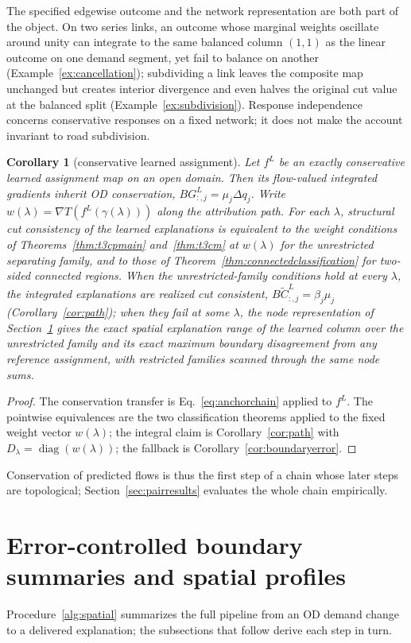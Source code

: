 \documentclass[a4paper,fleqn]{cas-sc}
\newtheorem{corollary}[theorem]{Corollary}
\begin{document}
The specified edgewise outcome and the network representation are both
part of the object. On two series links, an outcome whose marginal
weights oscillate around unity can integrate to the same balanced column
$(1,1)$ as the linear outcome on one demand segment, yet fail to balance
on another (Example~\ref{ex:cancellation}); subdividing a link leaves
the composite map unchanged but creates interior divergence and even
halves the original cut value at the balanced split
(Example~\ref{ex:subdivision}). Response independence concerns
conservative responses on a fixed network; it does not make the account
invariant to road subdivision.

\begin{corollary}[conservative learned assignment]\label{cor:learned}
Let $f^L$ be an exactly conservative learned assignment map on an open
domain. Then its flow-valued integrated gradients inherit OD
conservation, $BG^L_{:,j}=\mu_j\Delta q_j$. Write
$w(\lambda)=\nabla T(f^L(\gamma(\lambda)))$ along the attribution path.
For each $\lambda$, structural cut consistency of the learned
explanations is equivalent to the weight conditions of
Theorems~\ref{thm:t3cpmain} and~\ref{thm:t3cm} at $w(\lambda)$ for the
unrestricted separating family, and to those of
Theorem~\ref{thm:connectedclassification} for two-sided connected
regions. When the unrestricted-family conditions hold at every
$\lambda$, the integrated explanations are realized cut consistent,
$B\widetilde C^{L}_{:,j}=\beta_j\mu_j$
(Corollary~\ref{cor:path}); when they fail at some $\lambda$, the node
representation of Section~\ref{sec:stability} gives the exact spatial
explanation range of the learned column over the unrestricted family
and its exact maximum boundary disagreement from any reference
assignment, with restricted families scanned through the same node
sums.
\end{corollary}
\begin{proof}
The conservation transfer is Eq.~\eqref{eq:anchorchain} applied to
$f^L$. The pointwise equivalences are the two classification theorems
applied to the fixed weight vector $w(\lambda)$; the integral claim is
Corollary~\ref{cor:path} with
$D_\lambda=\operatorname{diag}(w(\lambda))$; the fallback is
Corollary~\ref{cor:boundaryerror}.
\end{proof}
Conservation of predicted flows is thus the first step of a chain whose
later steps are topological; Section~\ref{sec:pairresults} evaluates the
whole chain empirically.

\section{Error-controlled boundary summaries and spatial profiles}\label{sec:stability}\label{sec:algorithm}
Procedure~\ref{alg:spatial} summarizes the full pipeline from an OD
demand change to a delivered explanation; the subsections that follow
derive each step in turn.
\end{document}
